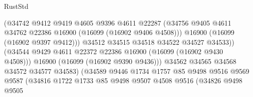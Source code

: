 \begin{lexlean}{RustStd}
\begin{coremodule}
                                        (@34742
                                          @9412
                                          @9419
                                          @4605
                                          @9396
                                          @4611
                                          @22287
                                          (@34756
                                            @9405
                                            @4611
                                            @34762
                                            @22386
                                            @16900
                                            (@16099 (@16902 @9406 @4508)))
                                          @16900
                                          (@16099 (@16902 @9397 @9412)))
                                        @34512
                                        @34515
                                        @34518
                                        @34522
                                        @34527
                                        @34533))
                                    (@34544
                                      @9429
                                      @4611
                                      @22372
                                      @22386
                                      @16900
                                      (@16099 (@16902 @9430 @4508)))
                                    @16900
                                    (@16099 (@16902 @9390 @9436)))
                                  @34562
                                  @34565
                                  @34568
                                  @34572
                                  @34577
                                  @34583)
                                (@34589
                                  @9446
                                  @1734
                                  @1757
                                  @85
                                  @9498
                                  @9516
                                  @9569
                                  @9587
                                  (@34816
                                    @1722
                                    @1733
                                    @85
                                    @9498
                                    @9507
                                    @4508
                                    @9516
                                    (@34826
                                      @9498
                                      @9505

\end{coremodule}
\end{lexlean}

